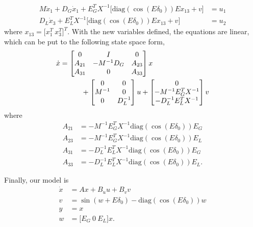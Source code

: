 \documentclass[journal]{IEEEtran}
\theoremstyle{definition}
\begin{document}
\begin{equation}
\begin{aligned}
M\ddot{x}_1+D_G\dot{x}_1+E_G^TX^{-1}\big[\text{diag}(\cos(E\delta_0))Ex_{13}+v\big]&=u_1 \\
D_L\dot{x}_3+E_L^TX^{-1}\big[\text{diag}(\cos(E\delta_0))Ex_{13}+v\big]&=u_2
\end{aligned}
\end{equation}
where $x_{13}=\big[x_1^T \ x_3^T\big]^T$.
With the new variables defined, the equations are linear, which can be put to the following state space form,
\begin{equation}
\begin{aligned}
\dot{x}&=\begin{bmatrix} 0 & I & 0 \\ A_{21} & -M^{-1}D_G & A_{23} \\ A_{31} & 0 & A_{33} \end{bmatrix}x \\
& \hskip 3em +\begin{bmatrix} 0 & 0 \\ M^{-1} & 0 \\ 0 & D_L^{-1} \end{bmatrix}u+\begin{bmatrix} 0 \\ -M^{-1}E_G^TX^{-1} \\ -D_L^{-1}E_L^TX^{-1} \end{bmatrix}v
\end{aligned}
\end{equation}
where 
$$\begin{aligned} 
A_{21}&=-M^{-1}E_G^TX^{-1}\text{diag}(\cos(E\delta_0))E_G \\
A_{23}&=-M^{-1}E_G^TX^{-1}\text{diag}(\cos(E\delta_0))E_L \\
A_{31}&=-D_L^{-1}E_L^TX^{-1}\text{diag}(\cos(E\delta_0))E_G \\
A_{33}&=-D_L^{-1}E_L^TX^{-1}\text{diag}(\cos(E\delta_0))E_L.
\end{aligned}$$

Finally, our model is
\begin{subequations}
\begin{align}
\dot{x}&=Ax+B_uu+B_vv \\
v&=\sin(w+E\delta_0)-\text{diag}(\cos(E\delta_0))w \\
y&=x \\
w&=\big[E_G \ 0 \ E_L\big]x.
\end{align}
\label{eqn_model}
\end{subequations}
\end{document}
